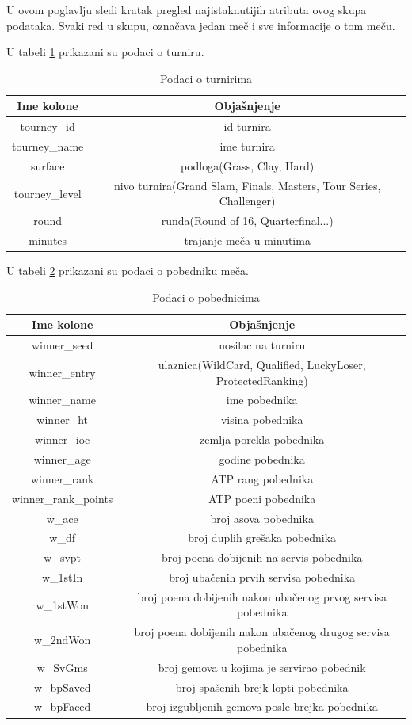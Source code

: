 \documentclass[a4paper]{article}
\begin{document}
U ovom poglavlju sledi kratak pregled najistaknutijih atributa ovog skupa podataka.
Svaki red u skupu, označava jedan meč i sve informacije o tom meču.

U tabeli \ref{table:turnir} prikazani su podaci o turniru.
\begin{table}
		\begin{tabular}{ | c | c | } 
			\hline
			Ime kolone & Objašnjenje \\ 
			\hline
			tourney\_id & id turnira \\
			tourney\_name & ime turnira \\
			surface & podloga(Grass, Clay, Hard) \\
			tourney\_level & nivo turnira(Grand Slam, Finals, Masters, Tour Series, Challenger) \\ 
			round & runda(Round of 16, Quarterfinal...) \\
			minutes & trajanje meča u minutima \\
			\hline
		\end{tabular}
	\caption{Podaci o turnirima}
	\label{table:turnir}
\end{table}

U tabeli \ref{table:pobednici} prikazani su podaci o pobedniku meča.
\begin{table}
		\begin{tabular}{ | c | c | } 
			\hline
			Ime kolone & Objašnjenje \\ 
			\hline
			winner\_seed & nosilac na turniru \\
			winner\_entry & ulaznica(WildCard, Qualified, LuckyLoser, ProtectedRanking) \\
			winner\_name & ime pobednika \\
			winner\_ht & visina pobednika \\
			winner\_ioc & zemlja porekla pobednika \\
			winner\_age & godine pobednika \\
			winner\_rank & ATP rang pobednika \\
			winner\_rank\_points & ATP poeni pobednika \\
			w\_ace & broj asova pobednika \\
			w\_df & broj duplih grešaka pobednika \\ 
			w\_svpt & broj poena dobijenih na servis pobednika \\
			w\_1stIn & broj ubačenih prvih servisa pobednika \\
			w\_1stWon & broj poena dobijenih nakon ubačenog prvog servisa pobednika \\
			w\_2ndWon & broj poena dobijenih nakon ubačenog drugog servisa pobednika \\
			w\_SvGms & broj gemova u kojima je servirao pobednik \\
			w\_bpSaved & broj spašenih brejk lopti pobednika \\
			w\_bpFaced & broj izgubljenih gemova posle brejka pobednika \\ 
			\hline
		\end{tabular}
	\caption{Podaci o pobednicima}
	\label{table:pobednici}
\end{table}
\end{document}
